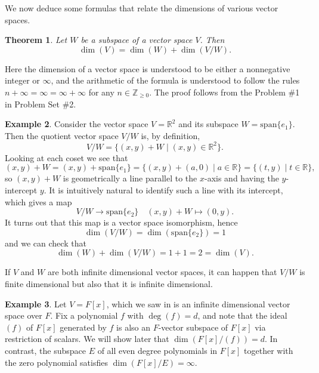 \documentclass[12pt]{report}
\newtheorem{theorem}{Theorem}[chapter]
\numberwithin{equation}{section}
\numberwithin{theorem}{chapter}
\theoremstyle{definition}
\newtheorem{example}[theorem]{Example}
\newtheorem*{basic properties}{Basic Properties}
\newtheorem*{Important Remark}{Important Remark}
\begin{document}
 
We now deduce some formulas that relate the dimensions of various vector spaces.
 
 
 
\begin{theorem}\label{dimension formula subspaces}
 Let $W$ be a subspace of a vector space $V$. Then 
 $$\dim(V) = \dim(W) + \dim(V/W).$$
 \end{theorem}
 
Here the dimension of a vector space is understood to be either a nonnegative integer or $\infty$, and the arithmetic of the formula is understood to follow the rules  $n+\infty=\infty=\infty+\infty$ for any $n\in \mathbb{Z}_{\geqslant 0}$. The proof follows from the Problem \#1 in Problem Set \#2.
 


\begin{example}
Consider the vector space $V = \mathbb{R}^2$ and its subspace $W=\mathrm{span}\{e_1\}$. Then the quotient vector space $V/W$ is, by definition,
$$V/W=\{(x,y)+W \mid (x,y)\in \mathbb{R}^2\}.$$
Looking at each coset we see that
$$(x,y)+W=(x,y)+\mathrm{span}\{e_1\}=\{(x,y)+(a,0)\mid a\in \mathbb{R}\}=\{(t,y)\mid t\in \mathbb{R}\},$$
so $(x,y)+W$ is geometrically a line parallel to the $x$-axis and having the $y$-intercept $y$. It is intuitively natural to identify such a line with its intercept, which gives a map
$$V/W\to \mathrm{span}\{e_2\} \quad (x,y)+W \mapsto (0,y).$$
It turns out that this map is a vector space isomorphism, hence 
$$\dim(V/W) = \dim(\mathrm{span}\{e_2\}) = 1$$ 
and we can check that 
$$\dim(W) + \dim(V/W) = 1+1 = 2 = \dim(V).$$
\end{example}


 
If $V$ and $W$ are both infinite dimensional vector spaces, it can happen that $V/W$ is finite dimensional but also that it is infinite dimensional.
 
\begin{example}
Let $V=F[x]$, which we saw in  is an infinite dimensional vector space over $F$. Fix a polynomial $f$ with $\deg(f)=d$, and note that the ideal $(f)$ of $F[x]$ generated by $f$ is also an $F$-vector subspace of $F[x]$ via restriction of scalars. We will show later that $\dim(F[x]/(f))=d$. In contrast, the subspace $E$ of all even degree polynomials in $F[x]$ together with the zero polynomial satisfies $\dim(F[x]/E)=\infty$.
\end{example}
 
 
 
\end{document}
